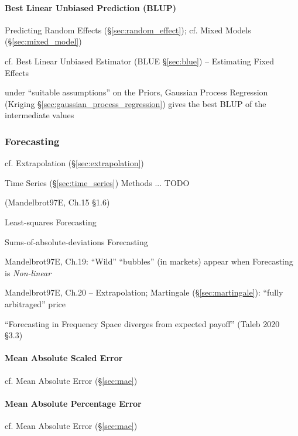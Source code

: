\paragraph{Best Linear Unbiased Prediction (BLUP)}\label{sec:blup}\hfill

Predicting Random Effects (\S\ref{sec:random_effect});
cf. Mixed Models (\S\ref{sec:mixed_model})

cf. Best Linear Unbiased Estimator (BLUE \S\ref{sec:blue}) -- Estimating
Fixed Effects

under ``suitable assumptions'' on the Priors, Gaussian Process Regression
(Kriging \S\ref{sec:gaussian_process_regression}) gives the best BLUP of the
intermediate values



\subsubsection{Forecasting}\label{sec:forecasting}

cf. Extrapolation (\S\ref{sec:extrapolation})

Time Series (\S\ref{sec:time_series}) Methods ... TODO

(Mandelbrot97E, Ch.15 \S 1.6)

Least-squares Forecasting

Sums-of-absolute-deviations Forecasting

Mandelbrot97E, Ch.19: ``Wild'' ``bubbles'' (in markets) appear when Forecasting
is \emph{Non-linear}

Mandelbrot97E, Ch.20 -- Extrapolation; Martingale (\S\ref{sec:martingale}):
``fully arbitraged'' price

``Forecasting in Frequency Space diverges from expected payoff''
(Taleb 2020 \S 3.3)



\paragraph{Mean Absolute Scaled Error}\label{sec:mase}\hfill

cf. Mean Absolute Error (\S\ref{sec:mae})



\paragraph{Mean Absolute Percentage Error}\label{sec:mape}\hfill

cf. Mean Absolute Error (\S\ref{sec:mae})



